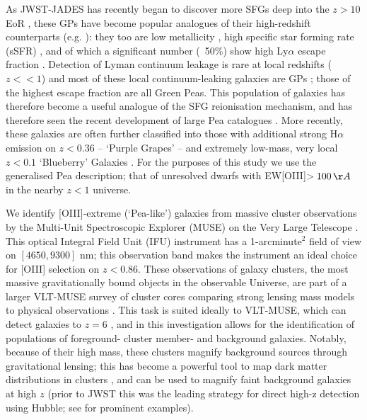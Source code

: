 \documentclass[fleqn,usenatbib]{mnras}
\begin{document}
As JWST-JADES has recently began to discover more SFGs deep into the $z>10$ EoR \citep{hainline_2023}, these GPs have become popular analogues of their high-redshift counterparts (e.g. \cite{brunker_2020, izotov_2018, Rhoads}): they too are low metallicity \citep{jiang}, high specific star forming rate (sSFR) \citep{brunker_2020, liu2022}, and of which a significant number (~50$\%$) show high Ly$\alpha$ escape fraction \cite{jaskotoey,yang_2017}. Detection of Lyman continuum leakage is rare at local redshifts ($z<<1$) and most of these local continuum-leaking galaxies are GPs \citep{yang_2016, izotov_2016}; those of the highest escape fraction are all Green Peas. This population of galaxies has therefore become a useful analogue of the SFG reionisation mechanism, and has therefore seen the recent development of large Pea catalogues \citep{samonski2025}. More recently, these galaxies are often further classified into those with additional strong H$\alpha$ emission on $z<0.36$ \citep{izotov2011} – ‘Purple Grapes’ – and extremely low-mass, very local $z<0.1$ ‘Blueberry’ Galaxies \citep{yang2017,liu2022}. For the purposes of this study we use the generalised Pea description; that of unresolved dwarfs with EW[OIII]$>100\,\AA$ in the nearby $z<1$ universe.

We identify [OIII]-extreme (‘Pea-like’) galaxies from massive cluster observations by the Multi-Unit Spectroscopic Explorer (MUSE) on the Very Large Telescope \citep{bacon2010}. This optical Integral Field Unit (IFU) instrument has a 1-arcminute$^2$ field of view on $[4650, 9300]$ nm; this observation band makes the instrument an ideal choice for [OIII] selection on $z<0.86$. These observations of galaxy clusters, the most massive gravitationally bound objects in the observable Universe, are part of a larger VLT-MUSE survey of cluster cores comparing strong lensing mass models to physical observations \citep{jauzac,jauzac2021}. This task is suited ideally to VLT-MUSE, which can detect galaxies to $z=6$ \citep{bacon2015}, and in this investigation allows for the identification of populations of foreground- cluster member- and background galaxies. Notably, because of their high mass, these clusters magnify background sources through gravitational lensing; this has become a powerful tool to map dark matter distributions in clusters \citep{massey2010}, and can be used to magnify faint background galaxies at high $z$ (prior to JWST this was the leading strategy for direct high-z detection using Hubble; see \cite{livermore2017, bouwens2018,kawamata2018} for prominent examples).
\end{document}
